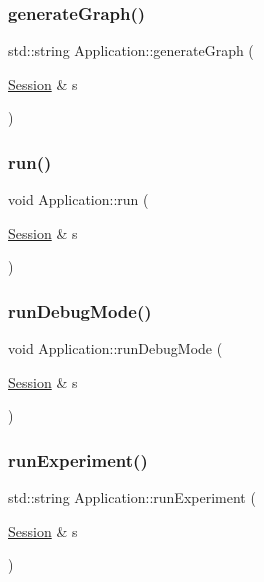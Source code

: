 \subsubsection{\texorpdfstring{generate\+Graph()}{generateGraph()}}
{\footnotesize\ttfamily std\+::string Application\+::generate\+Graph (\begin{DoxyParamCaption}\item[{\hyperlink{struct_session}{Session} \&}]{s }\end{DoxyParamCaption})}

\mbox{\label{class_application_adecc88549e44815bd94985ea043b733f}} 
\subsubsection{\texorpdfstring{run()}{run()}}
{\footnotesize\ttfamily void Application\+::run (\begin{DoxyParamCaption}\item[{\hyperlink{struct_session}{Session} \&}]{s }\end{DoxyParamCaption})}

\mbox{\label{class_application_adb639e3593f8f6f4dcb3d89d690eb538}} 
\subsubsection{\texorpdfstring{run\+Debug\+Mode()}{runDebugMode()}}
{\footnotesize\ttfamily void Application\+::run\+Debug\+Mode (\begin{DoxyParamCaption}\item[{\hyperlink{struct_session}{Session} \&}]{s }\end{DoxyParamCaption})}

\mbox{\label{class_application_a1d9cfbea705655427e7d1847de2567c1}} 
\subsubsection{\texorpdfstring{run\+Experiment()}{runExperiment()}}
{\footnotesize\ttfamily std\+::string Application\+::run\+Experiment (\begin{DoxyParamCaption}\item[{\hyperlink{struct_session}{Session} \&}]{s }\end{DoxyParamCaption})}

